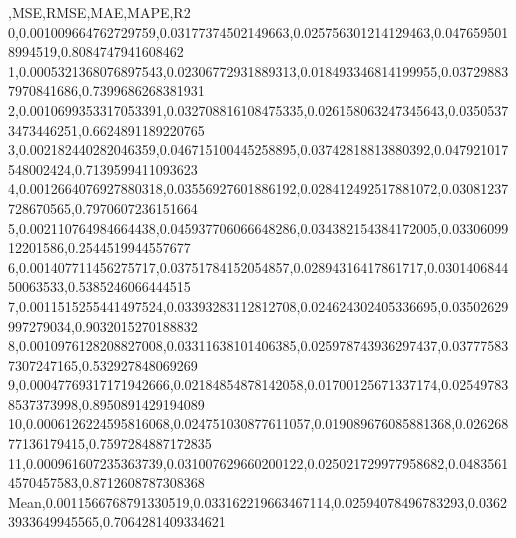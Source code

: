 ,MSE,RMSE,MAE,MAPE,R2
0,0.001009664762729759,0.03177374502149663,0.025756301214129463,0.0476595018994519,0.8084747941608462
1,0.0005321368076897543,0.02306772931889313,0.018493346814199955,0.037298837970841686,0.7399686268381931
2,0.0010699353317053391,0.032708816108475335,0.026158063247345643,0.03505373473446251,0.6624891189220765
3,0.002182440282046359,0.046715100445258895,0.03742818813880392,0.047921017548002424,0.7139599411093623
4,0.0012664076927880318,0.03556927601886192,0.028412492517881072,0.03081237728670565,0.7970607236151664
5,0.002110764984664438,0.045937706066648286,0.034382154384172005,0.0330609912201586,0.2544519944557677
6,0.001407711456275717,0.03751784152054857,0.02894316417861717,0.030140684450063533,0.5385246066444515
7,0.0011515255441497524,0.03393283112812708,0.024624302405336695,0.03502629997279034,0.9032015270188832
8,0.0010976128208827008,0.03311638101406385,0.025978743936297437,0.037775837307247165,0.532927848069269
9,0.00047769317171942666,0.02184854878142058,0.01700125671337174,0.025497838537373998,0.8950891429194089
10,0.0006126224595816068,0.024751030877611057,0.019089676085881368,0.02626877136179415,0.7597284887172835
11,0.000961607235363739,0.031007629660200122,0.025021729977958682,0.04835614570457583,0.8712608787308368
Mean,0.0011566768791330519,0.033162219663467114,0.02594078496783293,0.03623933649945565,0.7064281409334621
